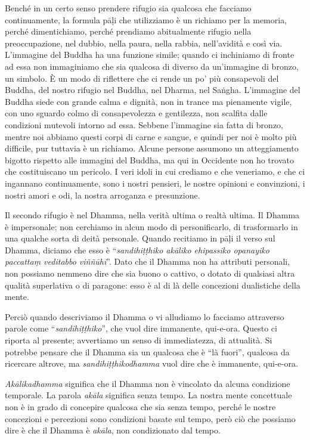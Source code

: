 Benché in un certo senso prendere rifugio sia qualcosa che facciamo
continuamente, la formula pāḷi che utilizziamo è un richiamo per la
memoria, perché dimentichiamo, perché prendiamo abitualmente rifugio
nella preoccupazione, nel dubbio, nella paura, nella rabbia,
nell'avidità e così via. L'immagine del Buddha ha una funzione simile;
quando ci inchiniamo di fronte ad essa non immaginiamo che sia qualcosa
di diverso da un'immagine di bronzo, un simbolo. È un modo di riflettere
che ci rende un po' più consapevoli del Buddha, del nostro rifugio nel
Buddha, nel Dharma, nel Saṅgha. L'immagine del Buddha siede con grande
calma e dignità, non in trance ma pienamente vigile, con uno sguardo
colmo di consapevolezza e gentilezza, non scalfita dalle condizioni
mutevoli intorno ad essa. Sebbene l'immagine sia fatta di bronzo, mentre
noi abbiamo questi corpi di carne e sangue, e quindi per noi è molto più
difficile, pur tuttavia è un richiamo. Alcune persone assumono un
atteggiamento bigotto rispetto alle immagini del Buddha, ma qui in
Occidente non ho trovato che costituiscano un pericolo. I veri idoli in
cui crediamo e che veneriamo, e che ci ingannano continuamente, sono i
nostri pensieri, le nostre opinioni e convinzioni, i nostri amori e odi,
la nostra arroganza e presunzione.

Il secondo rifugio è nel Dhamma, nella verità ultima o realtà ultima. Il
Dhamma è impersonale; non cerchiamo in alcun modo di personificarlo, di
trasformarlo in una qualche sorta di deità personale. Quando recitiamo
in pāḷi il verso sul Dhamma, diciamo che esso è ``\emph{sandihiṭṭhiko
akāliko ehipassiko opanayiko paccattaṃ veditabbo viññūhi}''. Dato che il
Dhamma non ha attributi personali, non possiamo nemmeno dire che sia
buono o cattivo, o dotato di qualsiasi altra qualità superlativa o di
paragone: esso è al di là delle concezioni dualistiche della mente.

Perciò quando descriviamo il Dhamma o vi alludiamo lo facciamo
attraverso parole come ``\emph{sandihiṭṭhiko}'', che vuol dire
immanente, qui-e-ora. Questo ci riporta al presente; avvertiamo un senso
di immediatezza, di attualità. Si potrebbe pensare che il Dhamma sia un
qualcosa che è ``là fuori'', qualcosa da ricercare altrove, ma
\emph{sandihiṭṭhikodhamma} vuol dire che è immanente, qui-e-ora.

\emph{Akālikadhamma} significa che il Dhamma non è vincolato da alcuna
condizione temporale. La parola \emph{akāla} significa senza tempo. La
nostra mente concettuale non è in grado di concepire qualcosa che sia
senza tempo, perché le nostre concezioni e percezioni sono condizioni
basate sul tempo, però ciò che possiamo dire è che il Dhamma è
\emph{akāla}, non condizionato dal tempo.

